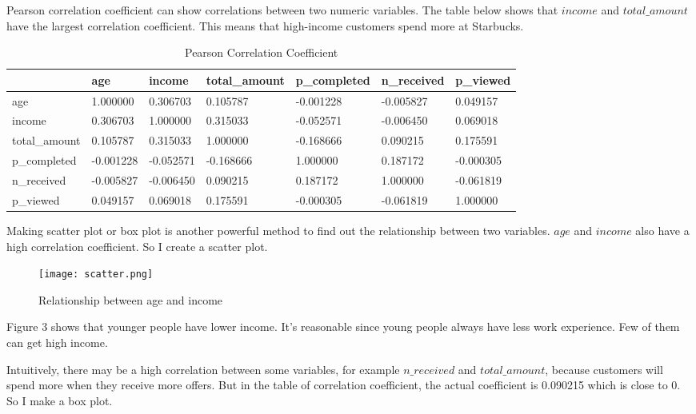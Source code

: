 \documentclass[a4paper,12pt]{article}
\begin{document}
Pearson correlation coefficient can show correlations between two numeric variables. The table below shows that $income$ and 
$total\_amount$ have the largest correlation coefficient. This means that high-income customers spend more at Starbucks. 

\begin{table}[H]
    \centering
    \scriptsize 
    \begin{tabular}{|l|l|l|l|l|l|l|}
    \hline
               & age       & income    & total\_amount & p\_completed & n\_received & p\_viewed \\
    \hline
    age           & 1.000000  & 0.306703  & 0.105787      & -0.001228    & -0.005827   & 0.049157  \\
    \hline
    income        & 0.306703  & 1.000000  & 0.315033      & -0.052571    & -0.006450   & 0.069018  \\
    \hline
    total\_amount & 0.105787  & 0.315033  & 1.000000      & -0.168666    & 0.090215    & 0.175591  \\
    \hline
    p\_completed  & -0.001228 & -0.052571 & -0.168666     & 1.000000     & 0.187172    & -0.000305 \\
    \hline
    n\_received   & -0.005827 & -0.006450 & 0.090215      & 0.187172     & 1.000000    & -0.061819 \\
    \hline
    p\_viewed     & 0.049157  & 0.069018  & 0.175591      & -0.000305    & -0.061819   & 1.000000 \\
    \hline
    \end{tabular}
    \caption{Pearson Correlation Coefficient}
\end{table}

Making scatter plot or box plot is another powerful method to find out the relationship between two variables. $age$ and $income$ 
also have a high correlation coefficient. So I create a scatter plot.

\begin{figure}[H]
    \centering
    \texttt{[image: scatter.png]} 
    \caption{Relationship between age and income}
\end{figure}

Figure 3 shows that younger people have lower income. It's reasonable since young people always have less work experience. Few 
of them can get high income.

Intuitively, there may be a high correlation between some variables, for example $n\_received$ and $total\_amount$, because 
customers will spend more when they receive more offers. But in the table of correlation coefficient, the actual coefficient is 
0.090215 which is close to 0. So I make a box plot.
\end{document}
